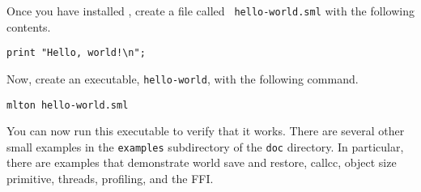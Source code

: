 Once you have installed {\mlton}, create a file called {\tt
hello-world.sml} with the following contents.

\begin{verbatim}
print "Hello, world!\n";
\end{verbatim}
Now, create an executable, {\tt hello-world}, with the following command.
\begin{verbatim}
mlton hello-world.sml
\end{verbatim}
You can now run this executable to verify that it works.  There are
several other small examples in the {\tt examples} subdirectory of the
{\tt doc} directory.  In particular, there are examples that
demonstrate world save and restore, callcc, object size primitive,
threads, profiling, and the FFI.
